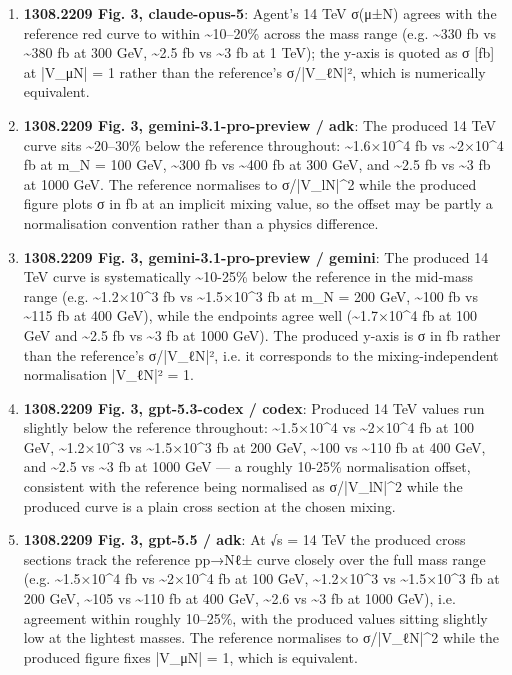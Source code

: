 \begin{enumerate}
\item \textbf{1308.2209 Fig. 3, claude-opus-5}: Agent's 14 TeV σ(μ±N) agrees with the reference red curve to within \textasciitilde{}10–20\% across the mass range (e.g. \textasciitilde{}330 fb vs \textasciitilde{}380 fb at 300 GeV, \textasciitilde{}2.5 fb vs \textasciitilde{}3 fb at 1 TeV); the y-axis is quoted as σ [fb] at |V\_μN| = 1 rather than the reference's σ/|V\_ℓN|², which is numerically equivalent.
\item \textbf{1308.2209 Fig. 3, gemini-3.1-pro-preview / adk}: The produced 14 TeV curve sits \textasciitilde{}20–30\% below the reference throughout: \textasciitilde{}1.6×10\textasciicircum{}4 fb vs \textasciitilde{}2×10\textasciicircum{}4 fb at m\_N = 100 GeV, \textasciitilde{}300 fb vs \textasciitilde{}400 fb at 300 GeV, and \textasciitilde{}2.5 fb vs \textasciitilde{}3 fb at 1000 GeV. The reference normalises to σ/|V\_lN|\textasciicircum{}2 while the produced figure plots σ in fb at an implicit mixing value, so the offset may be partly a normalisation convention rather than a physics difference.
\item \textbf{1308.2209 Fig. 3, gemini-3.1-pro-preview / gemini}: The produced 14 TeV curve is systematically \textasciitilde{}10-25\% below the reference in the mid-mass range (e.g. \textasciitilde{}1.2×10\textasciicircum{}3 fb vs \textasciitilde{}1.5×10\textasciicircum{}3 fb at m\_N = 200 GeV, \textasciitilde{}100 fb vs \textasciitilde{}115 fb at 400 GeV), while the endpoints agree well (\textasciitilde{}1.7×10\textasciicircum{}4 fb at 100 GeV and \textasciitilde{}2.5 fb vs \textasciitilde{}3 fb at 1000 GeV). The produced y-axis is σ in fb rather than the reference's σ/|V\_ℓN|², i.e. it corresponds to the mixing-independent normalisation |V\_ℓN|² = 1.
\item \textbf{1308.2209 Fig. 3, gpt-5.3-codex / codex}: Produced 14 TeV values run slightly below the reference throughout: \textasciitilde{}1.5×10\textasciicircum{}4 vs \textasciitilde{}2×10\textasciicircum{}4 fb at 100 GeV, \textasciitilde{}1.2×10\textasciicircum{}3 vs \textasciitilde{}1.5×10\textasciicircum{}3 fb at 200 GeV, \textasciitilde{}100 vs \textasciitilde{}110 fb at 400 GeV, and \textasciitilde{}2.5 vs \textasciitilde{}3 fb at 1000 GeV — a roughly 10-25\% normalisation offset, consistent with the reference being normalised as σ/|V\_lN|\textasciicircum{}2 while the produced curve is a plain cross section at the chosen mixing.
\item \textbf{1308.2209 Fig. 3, gpt-5.5 / adk}: At √s = 14 TeV the produced cross sections track the reference pp→Nℓ± curve closely over the full mass range (e.g. \textasciitilde{}1.5×10\textasciicircum{}4 fb vs \textasciitilde{}2×10\textasciicircum{}4 fb at 100 GeV, \textasciitilde{}1.2×10\textasciicircum{}3 vs \textasciitilde{}1.5×10\textasciicircum{}3 fb at 200 GeV, \textasciitilde{}105 vs \textasciitilde{}110 fb at 400 GeV, \textasciitilde{}2.6 vs \textasciitilde{}3 fb at 1000 GeV), i.e. agreement within roughly 10–25\%, with the produced values sitting slightly low at the lightest masses. The reference normalises to σ/|V\_ℓN|\textasciicircum{}2 while the produced figure fixes |V\_μN| = 1, which is equivalent.

\end{enumerate}
